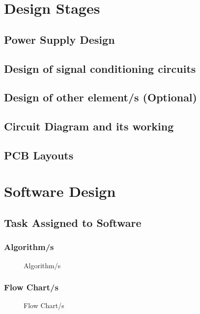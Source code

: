 \documentclass[12pt]{report}	%
\begin{document}
\section{Design Stages} 
\subsection{Power Supply Design }
\subsection{Design of signal conditioning circuits}
\subsection{Design of other element/s (Optional) }
\subsection{Circuit Diagram and its working }
\subsection{PCB Layouts}

\section{Software Design}

\subsection{Task Assigned to Software }

\subsubsection{Algorithm/s}
\begin{figure}[h!]
\begin{center}
	\caption{ Algorithm/s}
\end{center}
\end{figure}

\clearpage
\subsubsection{Flow Chart/s	}
\begin{figure}[h!]
\begin{center}
	\caption{Flow Chart/s	}
\end{center}
\end{figure}
\end{document}
